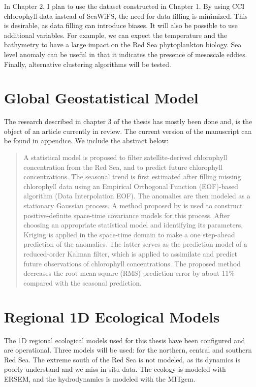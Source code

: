 In Chapter 2, I plan to use the dataset constructed in Chapter 1.  By using CCI
chlorophyll data instead of SeaWiFS, the need for data filling is minimized.
This is desirable, as data filling can introduce biases. It will also be
possible to use additional variables. For example, we can expect the
temperature and the bathymetry to have a large impact on the Red Sea
phytoplankton biology. Sea level anomaly can be useful in that it indicates the
presence of mesoscale eddies. Finally, alternative clustering algorithms will
be tested.

\section{Global Geostatistical Model}

The research described in chapter 3 of the thesis has mostly been
done and, is the object of an article currently in review. The current version
of the manuscript can be found in appendice. We include the abstract below:

\begin{quotation}
A statistical model is proposed to filter satellite-derived chlorophyll
concentration from the Red Sea, and to predict future chlorophyll
concentrations. The seasonal trend is first estimated after filling missing
chlorophyll data using an Empirical Orthogonal Function (EOF)-based algorithm
(Data Interpolation EOF). The anomalies are then modeled as a stationary
Gaussian process. A method proposed by \citet{Gneiting2002} is used to
construct positive-definite space-time covariance models for this process.
After choosing an appropriate statistical model and identifying its parameters,
Kriging is applied in the space-time domain to make a one step-ahead prediction
of the anomalies. The latter serves as the prediction model of a reduced-order
Kalman filter, which is applied to assimilate and predict future observations
of chlorophyll concentrations. The proposed method decreases the root mean
square (RMS) prediction error by about 11\% compared with the seasonal
prediction.
\end{quotation}

\section{Regional 1D Ecological Models}

The 1D regional ecological models used for this thesis have been configured and
are operational. Three models will be used: for the northern, central and
southern Red Sea. The extreme south of the Red Sea is not modeled, as its dynamics
is poorly understand and we miss in situ data.
The ecology is modeled with ERSEM, and the hydrodynamics is
modeled with the MITgcm.

